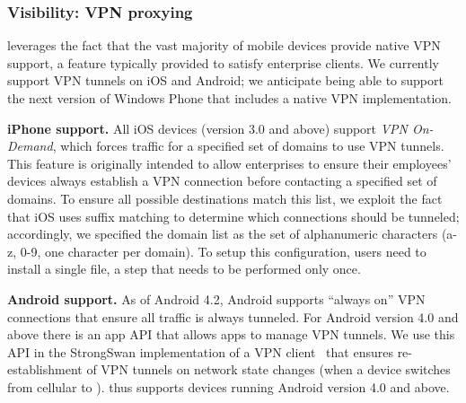%


\subsubsection{Visibility: VPN proxying}
\label{subsec:design_visibility}

\meddle leverages the fact that the vast majority of mobile devices provide native VPN support, a feature typically provided to satisfy enterprise clients. We currently support VPN tunnels on iOS and Android; we anticipate being able to support the next version of Windows Phone that includes a native VPN implementation.

\noindent\textbf{iPhone support.} 
All iOS devices (version 3.0 and above) support \textit{VPN On-Demand}, which forces traffic for a specified set of domains to use VPN tunnels. 
This feature is originally intended to allow enterprises to ensure their employees' devices always establish a VPN connection before contacting a specified set of domains. 
To ensure all possible destinations match this list, we exploit the fact that iOS uses suffix matching to determine which connections should be tunneled; accordingly, we specified the domain list as the set of alphanumeric characters (a-z, 0-9, one character per domain). 
To setup this configuration, users need to install a single file, a step that needs to be performed only once. 

\noindent\textbf{Android support.} As of Android 4.2, Android supports ``always on'' VPN connections that ensure all traffic is always tunneled.
For Android version 4.0 and above there is an app API that allows apps to manage VPN tunnels. 
We use this API in the StrongSwan implementation of a VPN client~\cite{strongswanclient} that ensures re-establishment of VPN tunnels on network state changes (\eg when a device switches from cellular to \wifi).
\meddle thus supports devices running Android version 4.0 and above.

